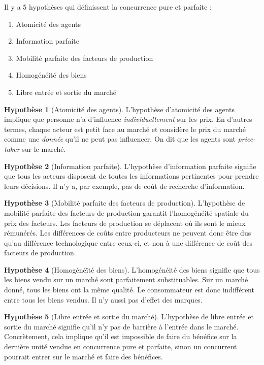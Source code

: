 \documentclass[
]{book}
\providecommand{\tightlist}{%
  \setlength{\itemsep}{0pt}\setlength{\parskip}{0pt}}
\theoremstyle{definition}
\theoremstyle{definition}
\theoremstyle{definition}
\theoremstyle{definition}
\newtheorem{hypothesis}{Hypothèse}[chapter]
\theoremstyle{remark}
\begin{document}
Il y a 5 hypothèses qui définissent la concurrence pure et parfaite :

\begin{enumerate}
\def\labelenumi{\arabic{enumi}.}
\tightlist
\item
  Atomicité des agents
\item
  Information parfaite
\item
  Mobilité parfaite des facteurs de production
\item
  Homogénéité des biens
\item
  Libre entrée et sortie du marché
\end{enumerate}

\begin{hypothesis}[Atomicité des agents]
L'hypothèse d'atomicité des agents implique que personne n'a d'influence \emph{individuellement} sur les prix.
En d'autres termes, chaque acteur est petit face au marché et considère le prix du marché comme une \emph{donnée} qu'il ne peut pas influencer.
On dit que les agents sont \emph{price-taker} sur le marché.
\end{hypothesis}

\begin{hypothesis}[Information parfaite]
L'hypothèse d'information parfaite signifie que tous les acteurs disposent de toutes les informations pertinentes pour prendre leurs décisions.
Il n'y a, par exemple, pas de coût de recherche d'information.
\end{hypothesis}

\begin{hypothesis}[Mobilité parfaite des facteurs de production]
L'hypothèse de mobilité parfaite des facteurs de production garantit l'homogénéité spatiale du prix des facteurs.
Les facteurs de production se déplacent où ils sont le mieux rémunérés.
Les différences de coûts entre producteurs ne peuvent donc être dus qu'au différence technologique entre ceux-ci, et non à une différence de coût des facteurs de production.
\end{hypothesis}

\begin{hypothesis}[Homogénéïté des biens]
L'homogénéité des biens signifie que tous les biens vendu sur un marché sont parfaitement substituables.
Sur un marché donné, tous les biens ont la même qualité.
Le consommateur est donc indifférent entre tous les biens vendus.
Il n'y aussi pas d'effet des marques.
\end{hypothesis}

\begin{hypothesis}[Libre entrée et sortie du marché]
L'hypothèse de libre entrée et sortie du marché signifie qu'il n'y pas de barrière à l'entrée dans le marché.
Concrètement, cela implique qu'il est impossible de faire du bénéfice sur la dernière unité vendue en concurrence pure et parfaite, sinon un concurrent pourrait entrer sur le marché et faire des bénéfices.
\end{hypothesis}
\end{document}
